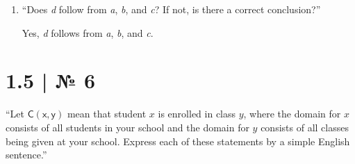 \documentclass[
   paper=a4,
   fontsize=11pt,
   parskip=no,       %
   fleqn             %
]{scrartcl}
\newcommand{\Pm}[1]{\ensuremath{\mathsf{#1}}}
\newcommand{\Pv}[1]{\ensuremath{\mathit{#1}}}
\begin{document}
\begin{enumerate}[
      leftmargin=0pt, labelsep=0.25em,
      label=\textsf{\textbf{\alph*)}}
]

   \item “Does \textit{d} follow from \textit{a}, \textit{b}, and \textit{c}? If not, is there a
   correct conclusion?”

   Yes, \textit{d} follows from \textit{a}, \textit{b}, and \textit{c}.

\end{enumerate}

\section*{1.5 | № 6}
\begin{addmargin}[2.5em]{2.5em}{\sffamily
      “Let \Pm{C(x, y)} mean that student \Pv{x} is enrolled in class \Pv{y}, where the domain for
      \Pv{x} consists of all students in your school and the domain for \Pv{y} consists of all
      classes being given at your school. Express each of these statements by a simple English
      sentence.”
}\end{addmargin}

\begin{enumerate}[
      leftmargin=0pt, labelsep=0.25em,
      label=\textsf{\textbf{\alph*)}}
]
\begin{multicols}{2}
\raggedcolumns



\end{multicols}
\end{enumerate}
\end{document}
